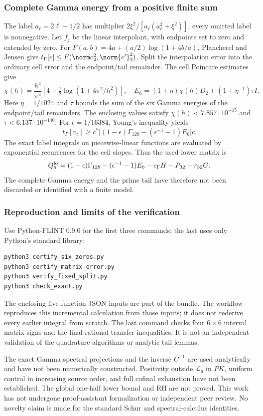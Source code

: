 \documentclass[11pt,a4paper]{article}
\numberwithin{equation}{section}
\theoremstyle{definition}\newtheorem{definition}[theorem]{Definition}
\theoremstyle{remark}\newtheorem{remark}[theorem]{Remark}
\begin{document}
\subsubsection*{Complete Gamma energy from a positive finite sum}
The label $a_\ell=2\ell+1/2$ has multiplier
$2\xi^2/[a_\ell(a_\ell^2+\xi^2)]$; every omitted label is nonnegative.
Let $f_j$ be the linear interpolant, with endpoints set to zero and
extended by zero. For $F(a,b)=4a+(a/2)\log(1+4b/a)$, Plancherel and
Jensen give $t_\Gamma[e]\le F(\norm e_2^2,\norm{e'}_2^2)$.
Split the interpolation error into the ordinary cell error and the
endpoint/tail remainder. The cell Poincare estimates give
\[
 \chi(h)=\frac{h^4}{\pi^4}\left[4+\tfrac12\log(1+4\pi^2/h^2)\right],
 \quad E_6=(1+\eta)\chi(h)D_2+(1+\eta^{-1})\tau I.
\]
Here $\eta=1/1024$ and $\tau$ bounds the sum of the six Gamma energies
of the endpoint/tail remainders. The enclosing values satisfy
$\chi(h)<7.857\cdot10^{-15}$ and $\tau<6.137\cdot10^{-140}$.
For $\epsilon=1/16384$, Young's inequality yields
\[
 t_\Gamma[v_c]\ge
 c^*\bigl[(1-\epsilon)\Gamma_{128}
                    -(\epsilon^{-1}-1)E_6\bigr]c.
\]
The exact label integrals on piecewise-linear functions are evaluated
by exponential recurrences for the cell slopes. Thus the used lower
matrix is
\[
 Q_6^{\rm lo}=(1-\epsilon)\Gamma_{128}
 - (\epsilon^{-1}-1)E_6-c_\Gamma H-P_{32}-r_{32}G.
\]
The complete Gamma energy and the prime tail have therefore not been
discarded or identified with a finite model.

\subsubsection*{Reproduction and limits of the verification}
Use Python-FLINT 0.9.0 for the first three commands; the last uses only
Python's standard library:
\begin{verbatim}
python3 certify_six_zeros.py
python3 certify_matrix_error.py
python3 verify_fixed_split.py
python3 check_exact.py
\end{verbatim}
The enclosing five-function JSON inputs are part of the bundle.
The workflow reproduces this incremental calculation from those inputs;
it does not rederive every earlier integral from scratch. The last
command checks four $6\times6$ interval matrix signs and the final
rational transfer inequalities. It is not an independent validation of
the quadrature algorithms or analytic tail lemmas.

The exact Gamma spectral projections and the inverse $C^{-1}$ are
used analytically and have not been numerically constructed. Positivity
outside $\mathcal L_6$ in $PK$, uniform control in increasing source order,
and full cofinal exhaustion have not been established. The global
one-half lower bound and RH are not proved. This work has not undergone
proof-assistant formalization or independent peer review. No novelty
claim is made for the standard Schur and spectral-calculus identities.
\end{document}

